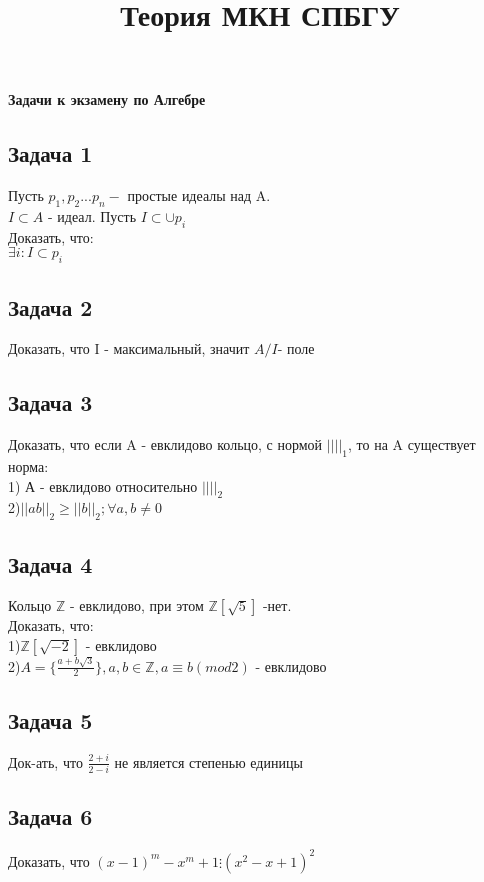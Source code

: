 \documentclass{article}
\title{Теория МКН СПБГУ}
\begin{document}
\begin{titlepage}
\begin{center}
{\LARGE \textbf{Задачи к экзамену по Алгебре}}
\end{center}
\begin{figure}[h]
\centering
\end{figure}
\end{titlepage}
\subsection*{Задача 1}
Пусть $p_1,p_2...p_n - $ простые идеалы над A.\\
$I\subset A$ - идеал. Пусть $I \subset \cup p_i$\\
Доказать, что:\\
$\exists i: I \subset p_i$
\subsection*{Задача 2}
Доказать, что I - максимальный, значит $A/I$- поле
\subsection*{Задача 3}
Доказать, что если A - евклидово кольцо, с нормой $|| ||_1$, то на A существует норма:\\
1) А - евклидово относительно $|| ||_2$\\
2)$||ab||_2\geq||b||_2; \forall a,b \neq 0$
\subsection*{Задача 4}
Кольцо $\mathbb{Z}$ - евклидово, при этом $\mathbb{Z}[\sqrt{5}]$ -нет.\\
Доказать, что:\\
1)$\mathbb{Z}[\sqrt{-2}]$ - евклидово\\
2)$A = \lbrace \frac{a+b\sqrt{3}}{2}\rbrace, a,b \in \mathbb{Z}, a\equiv b (mod 2)$ - евклидово
\subsection*{Задача 5}
Док-ать, что $\frac{2+i}{2-i}$ не является степенью единицы\\
\subsection*{Задача 6}
Доказать, что $(x-1)^m-x^m+1 \vdots (x^2-x+1)^2$
\end{document}
